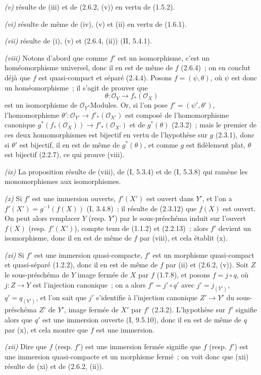 \documentclass[10pt,oneside]{book}
\newcommand{\oldpage}[2][]{%
  \setcounter{footnote}{0}%
  \marginpar{\scriptsize\textbf{#1}~|~#2}\ignorespaces}
\begin{document}
\emph{(v)} résulte de (iii) et de (2.6.2, (v)) en vertu de (1.5.2).

\emph{(vi)} résulte de même de (iv), (v) et (ii) en vertu de (1.6.1).

\emph{(vii)} résulte de (i), (v) et (2.6.4, (ii)) (II, 5.4.1).

\emph{(viii)} Notons d'abord que comme $f'$ est un isomorphisme, c'est un
homéomorphisme universel, donc il en est de même de $f$ (2.6.4)~; on en
conclut déjà que $f$ est quasi-compact et séparé (2.4.4). Posons
$f=(\psi,\theta)$, où $\psi$ est donc un homéomorphisme~; il s'agit de
prouver que
\[
\theta:\mathcal O_Y\longrightarrow f_*(\mathcal O_X)
\]
est un isomorphisme de $\mathcal O_Y$-Modules. Or, si l'on pose
$f'=(\psi',\theta')$, l'homomorphisme
$\theta':\mathcal O_{Y'}\to f'_*(\mathcal O_{X'})$ est composé de
l'homomorphisme canonique
$g^*(f_*(\mathcal O_X))\to f'_*(\mathcal O_{X'})$ et de $g^*(\theta)$
(2.3.2)~; mais le premier de ces deux homomorphismes est bijectif en vertu de
l'hypothèse sur $g$ (2.3.1), donc si $\theta'$ est bijectif,
\oldpage[IV-2]{31}
il en est de même de $g^*(\theta)$, et comme $g$ est fidèlement plat,
$\theta$ est bijectif (2.2.7), ce qui prouve (viii).

\emph{(ix)} La proposition résulte de (viii), de (I, 5.3.4) et de (I, 5.3.8)
qui ramène les monomorphismes aux isomorphismes.

\emph{(x)} Si $f'$ est une immersion ouverte, $f'(X')$ est ouvert dans $Y'$,
et l'on a $f'(X')=g^{-1}(f(X))$ (I, 3.4.8)~; il résulte de (2.3.12) que
$f(X)$ est ouvert. On peut alors remplacer $Y$ (resp. $Y'$) par le
sous-préschéma induit sur l'ouvert $f(X)$ (resp. $f'(X')$), compte tenu de
(1.1.2) et (2.2.13)~; alors $f'$ devient un isomorphisme, donc il en est de
même de $f$ par (viii), et cela établit (x).

\emph{(xi)} Si $f'$ est une immersion quasi-compacte, $f'$ est un morphisme
quasi-compact et quasi-séparé (1.2.2), donc il en est de même de $f$ par (ii)
et (2.6.2, (v)). Soit $Z$ le sous-préschéma de $Y$ image fermée de $X$ par
$f$ (1.7.8), et posons $f=j\circ q$, où $j:Z\to Y$ est l'injection
canonique~; on a alors $f'=j'\circ q'$ avec $j'=j_{(Y')}$,
$q'=q_{(Y')}$, et l'on sait que $j'$ s'identifie à l'injection canonique
$Z'\to Y'$ du sous-préschéma $Z'$ de $Y'$, image fermée de $X'$ par $f'$
(2.3.2). L'hypothèse sur $f'$ signifie alors que $q'$ est une immersion
ouverte (I, 9.5.10), donc il en est de même de $q$ par (x), et cela montre
que $f$ est une immersion.

\emph{(xii)} Dire que $f$ (resp. $f'$) est une immersion fermée signifie que
$f$ (resp. $f'$) est une immersion quasi-compacte et un morphisme fermé~; on
voit donc que (xii) résulte de (xi) et de (2.6.2, (ii)).
\end{document}
